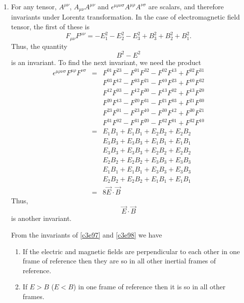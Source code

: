 \begin{enumerate}
\item For any tensor, $A^{\mu\nu}$, $A_{\mu\nu}A^{\mu\nu}$ and 
$\epsilon^{\mu\rho\nu\sigma}A^{\mu\rho}A^{\nu\sigma}$ are scalars, and therefore
invariants under Lorentz transformation. In the case of electromagnetic field
tensor, the first of these is
\[
F_{\mu\nu}F^{\mu\nu} = -E_1^2 - E_2^2 - E_3^2 + B_3^2 + B_2^2 + B_1^2.
\]
Thus, the quantity 
\begin{equation}\label{c3e97}
B^2 - E^2
\end{equation}
is an invariant. To find the next invariant, we
need the product
\begin{eqnarray*}
\epsilon^{\mu\rho\nu\sigma}F^{\mu\rho}F^{\nu\sigma} &=& F^{01}F^{23} - F^{01}F^{32} - F^{02}F^{13} + F^{02}F^{31} \\
 & & F^{03}F^{12} - F^{03}F^{21} - F^{10}F^{23} + F^{10}F^{32} \\
 & & F^{12}F^{03} - F^{12}F^{30} - F^{13}F^{02} + F^{13}F^{20} \\
 & & F^{20}F^{13} - F^{20}F^{31} - F^{21}F^{03} + F^{21}F^{30} \\
 & & F^{23}F^{01} - F^{23}F^{10} - F^{30}F^{12} + F^{30}F^{21} \\
 & & F^{31}F^{02} - F^{31}F^{20} - F^{32}F^{01} + F^{32}F^{10} \\
 &=& E_1B_1 + E_1B_1 + E_2B_2 + E_2B_2 \\
 & & E_3B_3 + E_3B_3 + E_1B_1 + E_1B_1 \\
 & & E_3B_3 + E_3B_3 + E_2B_2 + E_2B_2 \\
 & & E_2B_2 + E_2B_2 + E_3B_3 + E_3B_3 \\
 & & E_1B_1 + E_1B_1 + E_3B_3 + E_3B_3 \\
 & & E_2B_2 + E_2B_2 + E_1B_1 + E_1B_1 \\
 &=& 8\vec{E}\cdot\vec{B}
\end{eqnarray*}
Thus, \begin{equation}\label{c3e98}
\vec{E}\cdot\vec{B}
\end{equation}
is another invariant.

From the invariants of \eqref{c3e97} and \eqref{c3e98} we have
\begin{enumerate}
\item If the electric and magnetic fields are
perpendicular to each other in one frame of reference then they are so in all 
other inertial frames of reference.

\item If $E > B$ ($E < B$) in one frame of reference then it is so in all other
frames.


\end{enumerate}
\end{enumerate}
